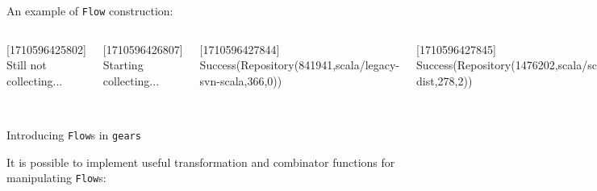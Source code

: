 \documentclass[aspectratio=1610,xcolor=dvipsnames]{beamer}
\begin{document}
%
\begin{frame}
  An example of \texttt{Flow} construction: 
  
\end{frame}
%
\begin{frame}
  \begin{columns}
      

      

      \footnotesize
      [1710596425802] Still not collecting...

      [1710596426807] Starting collecting...

      [1710596427844] Success(Repository(841941,scala/legacy-svn-scala,366,0))

      [1710596427845] Success(Repository(1476202,scala/scala-dist,278,2))

      ...

      [1710596428750] Done!

      \vspace*{0.4cm}

      [1710596865118] Still not collecting...

      [1710596866120] Starting collecting...

      [1710596866383] Failure(java.lang.Exception:\{"message":"Not Found",...\})

      [1710596866383] Done!

      \vspace*{1.2cm}
  \end{columns}
\end{frame}
%
\begin{frame}{Introducing \texttt{Flow}s in \texttt{gears}}
  
\end{frame}
%
\begin{frame}
  
\end{frame}
%
\begin{frame}
  It is possible to implement useful transformation and combinator functions for manipulating \texttt{Flow}s:
  
\end{frame}
%
\end{document}
